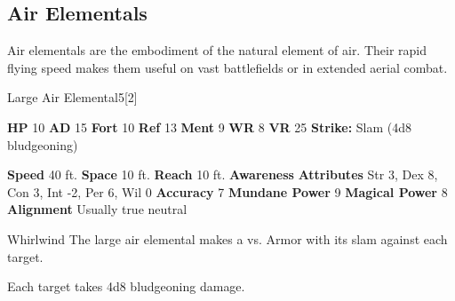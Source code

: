       
    \subsection{Air Elementals}
      
      Air elementals are the embodiment of the natural element of air.
      Their rapid flying speed makes them useful on vast battlefields or in extended aerial combat.
    

      
  \begin{monsubsection}{Large Air Elemental}{5}[2]
    \vspace{-1em}\vspace{-1em}
    \vspace{0em}

    
    

    \begin{spellcontent}
      \begin{spelltargetinginfo}
        \pari \textbf{HP} 10 \monsep
          \textbf{AD} 15 \monsep
          \textbf{Fort} 10 \monsep
          \textbf{Ref} 13 \monsep
          \textbf{Ment} 9
        \pari \textbf{WR} 8 \monsep
        \textbf{VR} 25
        \pari \textbf{Strike:}
            Slam  (4d8 bludgeoning)
      \end{spelltargetinginfo}
    \end{spellcontent}
    \begin{monsterfooter}
      \pari \textbf{Speed} 40 ft. \monsep
        \textbf{Space} 10 ft. \monsep
        \textbf{Reach} 10 ft.
      \pari \textbf{Awareness} 
      \pari \textbf{Attributes}
        Str 3, Dex 8,
        Con 3, Int -2,
        Per 6, Wil 0
      \pari \textbf{Accuracy} 7 \monsep
        \textbf{Mundane Power} 9 \monsep
      \textbf{Magical Power} 8
      \pari \textbf{Alignment} Usually true neutral
    \end{monsterfooter}
  \end{monsubsection}
  \begin{freeability}{Whirlwind}
       The large air elemental makes a 
         vs. Armor
        with its slam against each target.
    
    \hit Each target takes 4d8 bludgeoning damage.
    \end{freeability}
  

